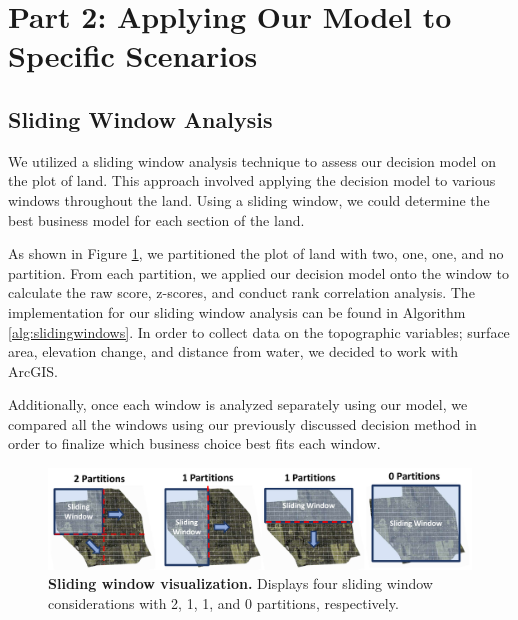 \documentclass{mcmthesis}
\begin{document}
\section{Part 2: Applying Our Model to Specific Scenarios}
\subsection{Sliding Window Analysis}
We utilized a sliding window analysis technique to assess our decision model on the plot of land. This approach involved applying the decision model to various windows throughout the land. Using a sliding window, we could determine the best business model for each section of the land.

As shown in Figure \ref{fig:slidingwindow}, we partitioned the plot of land with two, one, one, and no partition. From each partition, we applied our decision model onto the window to calculate the raw score, z-scores, and conduct rank correlation analysis. The implementation for our sliding window analysis can be found in Algorithm \ref{alg:slidingwindows}. In order to collect data on the topographic variables; surface area, elevation change, and distance from water, we decided to work with ArcGIS.  

Additionally, once each window is analyzed separately using our model, we compared all the windows using our previously discussed decision method in order to finalize which business choice best fits each window.

\begin{figure}[!htbp]
    \centering
    \includegraphics[scale=0.58]{figures/slidingwindow.pdf}
    \caption{\textbf{Sliding window visualization.} Displays four sliding window considerations with 2, 1, 1, and 0 partitions, respectively.}
    \label{fig:slidingwindow}
\end{figure}
\end{document}
